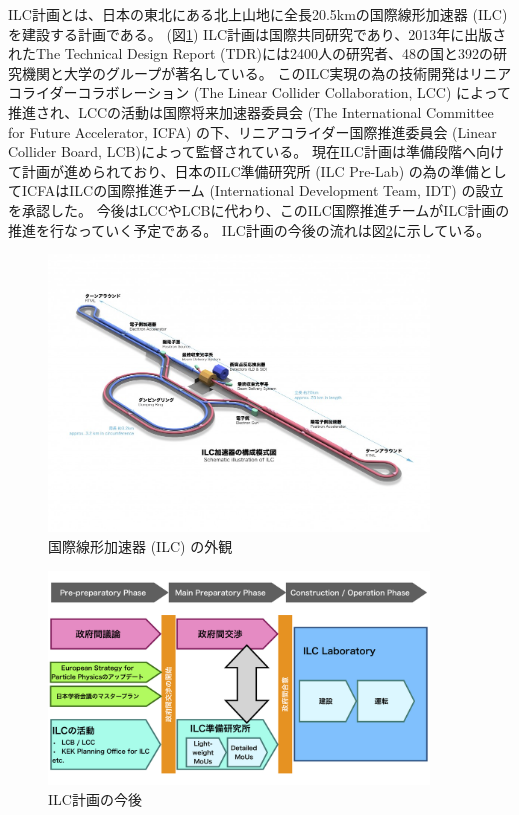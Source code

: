 ILC計画とは、日本の東北にある北上山地に全長20.5kmの国際線形加速器 (ILC) を建設する計画である。 (図\ref{2InternationalLinearCollider})
ILC計画は国際共同研究であり、2013年に出版されたThe Technical Design Report (TDR)には2400人の研究者、48の国と392の研究機関と大学のグループが著名している。
このILC実現の為の技術開発はリニアコライダーコラボレーション (The Linear Collider Collaboration, LCC) によって推進され、LCCの活動は国際将来加速器委員会 (The International Committee for Future Accelerator, ICFA) の下、リニアコライダー国際推進委員会 (Linear Collider Board, LCB)によって監督されている。
現在ILC計画は準備段階へ向けて計画が進められており、日本のILC準備研究所 (ILC Pre-Lab) の為の準備としてICFAはILCの国際推進チーム (International Development Team, IDT) の設立を承認した。
今後はLCCやLCBに代わり、このILC国際推進チームがILC計画の推進を行なっていく予定である。
ILC計画の今後の流れは図\ref{3ILCProject}に示している。

\begin{figure}[h]
 \centering
  \includegraphics[width=0.9\textwidth]{Figure/1Introduction/2InternationalLinearCollider.jpg}
  \caption{国際線形加速器 (ILC) の外観\cite{ILCPHOTO}}
  \label{2InternationalLinearCollider}
\end{figure}


\begin{figure}[h]
 \centering
 \includegraphics[width=0.9\textwidth]{Figure/1Introduction/3ILCProject.png}
 \caption{ILC計画の今後\cite{RecommendationsonILCProjectImplementation}}
 \label{3ILCProject}
\end{figure}

